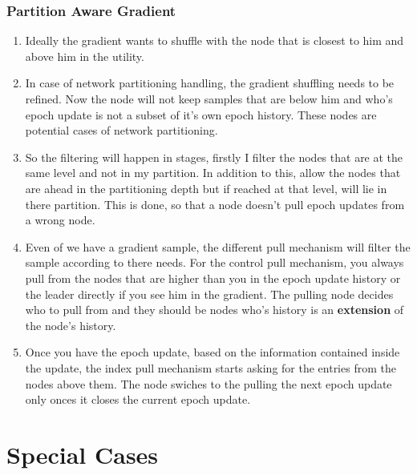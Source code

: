 \documentclass[a4paper, 11pt]{article}
\begin{document}
\subsubsection{Partition Aware Gradient}

\begin{enumerate}

\item Ideally the gradient wants to shuffle with the node that is closest to him and above him in the utility.

\item In case of network partitioning handling, the gradient shuffling needs to be refined. Now the node will not keep samples that are below him and who's epoch update is not a subset of it's own epoch history. These nodes are potential cases of network partitioning.

\item So the filtering will happen in stages, firstly I filter the nodes that are at the same level and not in my partition. In addition to this, 
allow the nodes that are ahead in the partitioning depth but if reached at that level, will lie in there partition. This is done, so that a node doesn't pull epoch updates from a wrong node.

\item Even of we have a gradient sample, the different pull mechanism will filter the sample according to there needs. For the control pull mechanism, you always pull from the nodes that are higher than you in the epoch update history or the leader directly if you see him in the gradient.
The pulling node decides who to pull from and they should be nodes who's history is an \textbf{extension} of the node's history.


\item Once you have the epoch update, based on the information contained inside the update, the index pull mechanism starts asking for the entries from the nodes above them. The node swiches to the pulling the next epoch update only onces it closes the current epoch update.

\end{enumerate}




\section{Special Cases}
\end{document}
